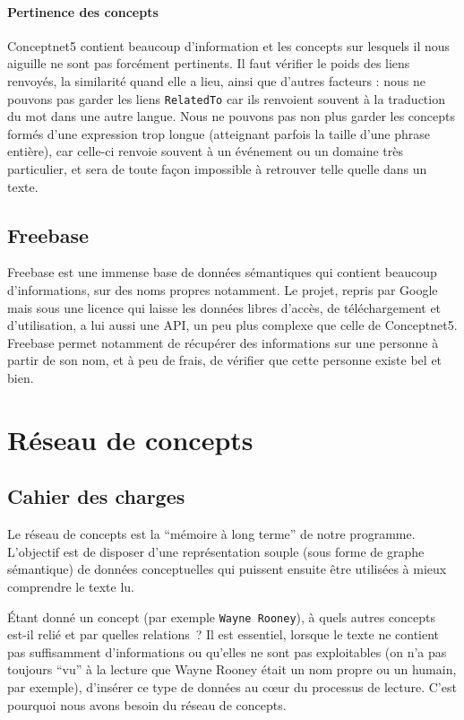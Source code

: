 \documentclass[a4paper, 12pt]{article}
\begin{document}
\paragraph{Pertinence des concepts}
Conceptnet5 contient beaucoup d'information et les concepts sur lesquels il nous aiguille ne sont pas forcément pertinents. Il faut vérifier le poids des liens renvoyés, la similarité quand elle a lieu, ainsi que d'autres facteurs : nous ne pouvons pas garder les liens \verb|RelatedTo| car ils renvoient souvent à la traduction du mot dans une autre langue. Nous ne pouvons pas non plus garder les concepts formés d'une expression trop longue (atteignant parfois la taille d'une phrase entière), car celle-ci renvoie souvent à un événement ou un domaine très particulier, et sera de toute façon impossible à retrouver telle quelle dans un texte.


\subsection{Freebase}

Freebase est une immense base de données sémantiques qui contient beaucoup d'informations, sur des noms propres notamment. Le projet, repris par Google mais sous une licence qui laisse les données libres d'accès, de téléchargement et d'utilisation, a lui aussi une API, un peu plus complexe que celle de Conceptnet5. Freebase permet notamment de récupérer des informations sur une personne à partir de son nom, et à peu de frais, de vérifier que cette personne existe bel et bien.


\section{Réseau de concepts}

\subsection{Cahier des charges}

Le réseau de concepts est la ``mémoire à long terme'' de notre programme. L'objectif est de disposer d'une représentation souple (sous forme de graphe sémantique) de données conceptuelles qui puissent ensuite être utilisées à mieux comprendre le texte lu.

Étant donné un concept (par exemple \verb|Wayne Rooney|), à quels autres concepts est-il relié et par quelles relations~? Il est essentiel, lorsque le texte ne contient pas suffisamment d'informations ou qu'elles ne sont pas exploitables (on n'a pas toujours ``vu'' à la lecture que Wayne Rooney était un nom propre ou un humain, par exemple), d'insérer ce type de données au cœur du processus de lecture. C'est pourquoi nous avons besoin du réseau de concepts.
\end{document}
